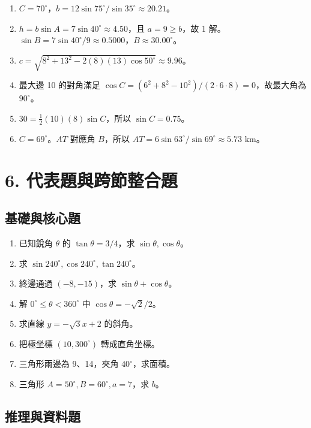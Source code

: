 \documentclass[11pt,a4paper]{article}
\providecommand{\tightlist}{%
  \setlength{\itemsep}{0pt}\setlength{\parskip}{0pt}}
\begin{document}
\begin{enumerate}
\def\labelenumi{\arabic{enumi}.}
\tightlist
\item
  \(C=70^\circ\)，\(b=12\sin75^\circ/\sin35^\circ\approx\boxed{20.21}\)。
\item
  \(h=b\sin A=7\sin40^\circ\approx4.50\)，且 \(a=9\ge b\)，故 1 解。\(\sin B=7\sin40^\circ/9\approx0.5000\)，\(B\approx\boxed{30.00^\circ}\)。
\item
  \(c=\sqrt{8^2+13^2-2(8)(13)\cos50^\circ}\approx\boxed{9.96}\)。
\item
  最大邊 10 的對角滿足 \(\cos C=(6^2+8^2-10^2)/(2\cdot6\cdot8)=0\)，故最大角為 \(\boxed{90^\circ}\)。
\item
  \(30=\frac12(10)(8)\sin C\)，所以 \(\boxed{\sin C=0.75}\)。
\item
  \(C=69^\circ\)。\(AT\) 對應角 \(B\)，所以 \(AT=6\sin63^\circ/\sin69^\circ\approx\boxed{5.73\text{ km}}\)。
\end{enumerate}

\section{6. 代表題與跨節整合題}\label{ux4ee3ux8868ux984cux8207ux8de8ux7bc0ux6574ux5408ux984c}

\subsection{基礎與核心題}\label{ux57faux790eux8207ux6838ux5fc3ux984c}

\begin{enumerate}
\def\labelenumi{\arabic{enumi}.}
\tightlist
\item
  已知銳角 \(\theta\) 的 \(\tan\theta=3/4\)，求 \(\sin\theta,\cos\theta\)。
\item
  求 \(\sin240^\circ,\cos240^\circ,\tan240^\circ\)。
\item
  終邊通過 \((-8,-15)\)，求 \(\sin\theta+\cos\theta\)。
\item
  解 \(0^\circ\le\theta<360^\circ\) 中 \(\cos\theta=-\sqrt2/2\)。
\item
  求直線 \(y=-\sqrt3x+2\) 的斜角。
\item
  把極坐標 \((10,300^\circ)\) 轉成直角坐標。
\item
  三角形兩邊為 9、14，夾角 \(40^\circ\)，求面積。
\item
  三角形 \(A=50^\circ,B=60^\circ,a=7\)，求 \(b\)。
\end{enumerate}

\subsection{推理與資料題}\label{ux63a8ux7406ux8207ux8cc7ux6599ux984c}
\end{document}
